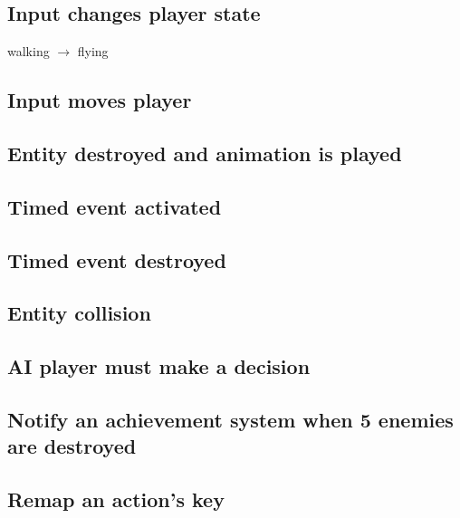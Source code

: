 \documentclass[12pt]{article}
\begin{document}
\subsection{Input changes player state}
walking $\rightarrow$ flying
\subsection{Input moves player}
\subsection{Entity destroyed and animation is played}
\subsection{Timed event activated}
\subsection{Timed event destroyed}
\subsection{Entity collision}
\subsection{AI player must make a decision}
\subsection{Notify an achievement system when 5 enemies are destroyed}
\subsection{Remap an action's key}
\end{document}
